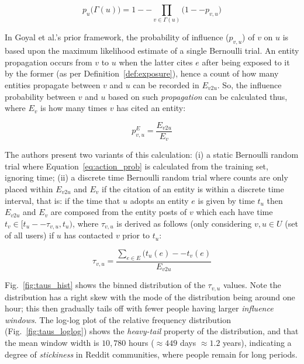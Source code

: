 \documentclass[sigconf,anonymous,review]{acmart}
\begin{document}
\begin{equation}
\label{eq:joint_prob}
p_u\big(\Gamma(u)\big) = 1 -- \displaystyle\prod_{v \in \Gamma(u)}\big(1 -- p_{v,u}\big)
\end{equation}

In Goyal et al.'s prior framework, the probability of influence ($p_{v,u}$) of $v$ on $u$ is based upon the maximum likelihood estimate of a single Bernoulli trial.
An entity propagation occurs from $v$ to $u$ when the latter cites $e$ after being exposed to it by the former (as per Definition~\ref{def:exposure}), hence a count of how many entities propagate between $v$ and $u$ can be recorded in $E_{v2u}$.
So, the influence probability between $v$ and $u$ based on such \emph{propagation} can be calculated thus, where $E_v$ is how many times $v$ has cited an entity:

\begin{equation}
\label{eq:action_prob}
p^{E}_{v,u} = \frac{E_{v2u}}{E_v}
\end{equation}

The authors present two variants of this calculation: (i) a static Bernoulli random trial where Equation~\ref{eq:action_prob} is calculated from the training set, ignoring time; (ii) a discrete time Bernoulli random trial where counts are only placed within $E_{v2u}$ and $E_v$ if the citation of an entity is within a discrete time interval, that is: if the time that $u$ adopts an entity $e$ is given by time $t_u$ then $E_{v2u}$ and $E_v$ are composed from the entity posts of $v$ which each have time $t_v \in [t_u -- \tau_{v,u}, t_u)$, where $\tau_{v,u}$ is derived as follows (only considering $v, u \in U$ (set of all users) if $u$ has contacted $v$ prior to $t_u$:

\begin{equation}
\tau_{v,u} = \frac{\displaystyle\sum_{e \in E} (t_u(e) -- t_v(e)}{E_{v2u}}
\end{equation}

Fig.~\ref{fig:taus_hist} shows the binned distribution of the $\tau_{v,u}$ values. Note the distribution has a right skew with the mode of the distribution being around one hour; this then gradually tails off with fewer people having larger \emph{influence windows}.
The log-log plot of the relative frequency distribution (Fig.~\ref{fig:taus_loglog}) shows the \emph{heavy-tail} property of the distribution, and that the mean window width is $10,780$ hours ($\approx 449$ days $\approx 1.2$ years), indicating a degree of \emph{stickiness} in Reddit communities, where people remain for long periods.
\end{document}
